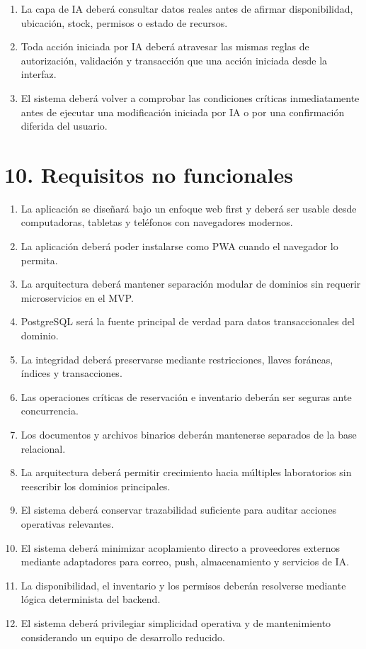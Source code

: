 \documentclass[12pt]{article}
\begin{document}
\begin{enumerate}[label=RF\arabic*., leftmargin=1.3cm]
    \item La capa de IA deberá consultar datos reales antes de afirmar disponibilidad, ubicación, stock, permisos o estado de recursos.
    \item Toda acción iniciada por IA deberá atravesar las mismas reglas de autorización, validación y transacción que una acción iniciada desde la interfaz.
    \item El sistema deberá volver a comprobar las condiciones críticas inmediatamente antes de ejecutar una modificación iniciada por IA o por una confirmación diferida del usuario.
\end{enumerate}

\section*{10. Requisitos no funcionales}

\begin{enumerate}[label=RNF\arabic*., leftmargin=1.4cm]
    \item La aplicación se diseñará bajo un enfoque web first y deberá ser usable desde computadoras, tabletas y teléfonos con navegadores modernos.
    \item La aplicación deberá poder instalarse como PWA cuando el navegador lo permita.
    \item La arquitectura deberá mantener separación modular de dominios sin requerir microservicios en el MVP.
    \item PostgreSQL será la fuente principal de verdad para datos transaccionales del dominio.
    \item La integridad deberá preservarse mediante restricciones, llaves foráneas, índices y transacciones.
    \item Las operaciones críticas de reservación e inventario deberán ser seguras ante concurrencia.
    \item Los documentos y archivos binarios deberán mantenerse separados de la base relacional.
    \item La arquitectura deberá permitir crecimiento hacia múltiples laboratorios sin reescribir los dominios principales.
    \item El sistema deberá conservar trazabilidad suficiente para auditar acciones operativas relevantes.
    \item El sistema deberá minimizar acoplamiento directo a proveedores externos mediante adaptadores para correo, push, almacenamiento y servicios de IA.
    \item La disponibilidad, el inventario y los permisos deberán resolverse mediante lógica determinista del backend.
    \item El sistema deberá privilegiar simplicidad operativa y de mantenimiento considerando un equipo de desarrollo reducido.
\end{enumerate}
\end{document}

